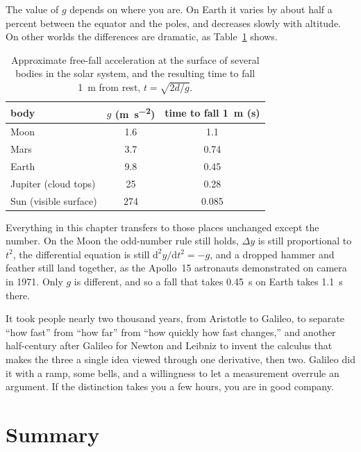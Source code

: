 \documentclass[11pt,twoside,openany]{book}
\newcommand{\dd}{\mathrm{d}}
\begin{document}
The value of $g$ depends on where you are. On Earth it varies by about half a percent between the equator and the poles, and decreases slowly with altitude. On other worlds the differences are dramatic, as Table~\ref{tab:gvalues} shows.

\begin{table}[htb]
\centering
\caption{Approximate free-fall acceleration at the surface of several bodies in the solar system, and the resulting time to fall \SI{1}{\metre} from rest, $t = \sqrt{2d/g}$.}
\label{tab:gvalues}
\renewcommand{\arraystretch}{1.2}
\begin{tabular}{lcc}
\toprule
body & $g$ (\si{\metre\per\second\squared}) & time to fall \SI{1}{\metre} (s) \\
\midrule
Moon    & 1.6  & 1.1 \\
Mars    & 3.7  & 0.74 \\
Earth   & 9.8  & 0.45 \\
Jupiter (cloud tops) & 25 & 0.28 \\
Sun (visible surface) & 274 & 0.085 \\
\bottomrule
\end{tabular}
\end{table}

Everything in this chapter transfers to those places unchanged except the number. On the Moon the odd-number rule still holds, $\Delta y$ is still proportional to $t^2$, the differential equation is still $\dd^2 y/\dd t^2 = -g$, and a dropped hammer and feather still land together, as the Apollo~15 astronauts demonstrated on camera in 1971. Only $g$ is different, and so a fall that takes \SI{0.45}{\second} on Earth takes \SI{1.1}{\second} there.

It took people nearly two thousand years, from Aristotle to Galileo, to separate ``how fast'' from ``how far'' from ``how quickly how fast changes,'' and another half-century after Galileo for Newton and Leibniz to invent the calculus that makes the three a single idea viewed through one derivative, then two. Galileo did it with a ramp, some bells, and a willingness to let a measurement overrule an argument. If the distinction takes you a few hours, you are in good company.

\section{Summary}
\end{document}
